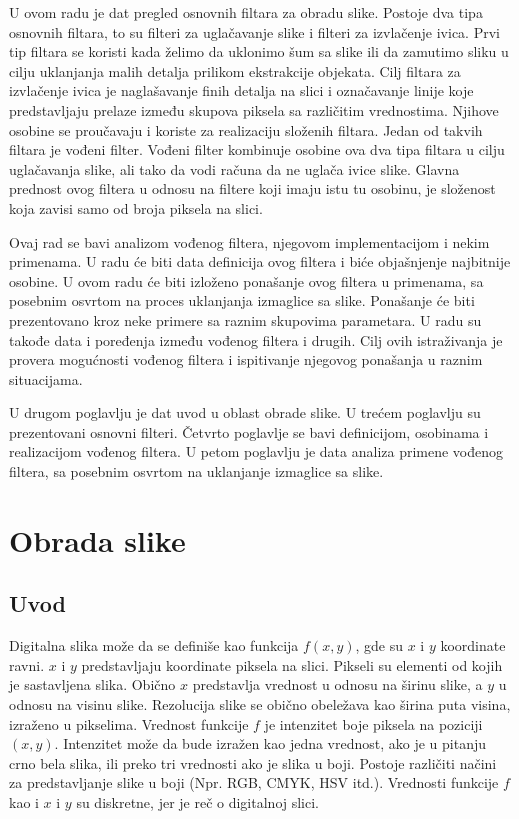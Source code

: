 \documentclass[a4paper,12pt,titlepage]{article}
\begin{document}
U ovom radu je dat pregled osnovnih filtara za obradu slike. Postoje dva tipa osnovnih filtara, to su filteri za uglačavanje slike i filteri za izvlačenje ivica. Prvi tip filtara se koristi kada želimo da uklonimo šum sa slike ili da zamutimo sliku u cilju uklanjanja malih detalja prilikom ekstrakcije objekata. Cilj filtara za izvlačenje ivica je naglašavanje finih detalja na slici i označavanje linije koje predstavljaju prelaze između skupova piksela sa različitim vrednostima. Njihove osobine se proučavaju i koriste za realizaciju složenih filtara. Jedan od takvih filtara je vođeni filter. Vođeni filter kombinuje osobine ova dva tipa filtara u cilju uglačavanja slike, ali tako da vodi računa da ne uglača ivice slike. Glavna prednost ovog filtera u odnosu na filtere koji imaju istu tu osobinu, je složenost koja zavisi samo od broja piksela na slici. 

Ovaj rad se bavi analizom vođenog filtera, njegovom implementacijom i nekim primenama. U radu će biti data definicija ovog filtera i biće objašnjenje najbitnije osobine. U ovom radu će biti izloženo ponašanje ovog filtera u primenama, sa posebnim osvrtom na proces uklanjanja izmaglice sa slike. Ponašanje će biti prezentovano kroz neke primere sa raznim skupovima parametara. U radu su takođe data i poređenja između vođenog filtera i drugih. Cilj ovih istraživanja je provera mogućnosti vođenog filtera i ispitivanje njegovog ponašanja u raznim situacijama. 

U drugom poglavlju je dat uvod u oblast obrade slike. U trećem poglavlju su prezentovani osnovni filteri. Četvrto poglavlje se bavi definicijom, osobinama i realizacijom vođenog filtera. U petom poglavlju je data analiza primene vođenog filtera, sa posebnim osvrtom na uklanjanje izmaglice sa slike.

\section{Obrada slike}%

\subsection{Uvod}%

Digitalna slika može da se definiše kao funkcija $f(x, y)$, gde su $x$ i $y$ koordinate ravni. $x$ i $y$ predstavljaju koordinate piksela na slici. Pikseli su elementi od kojih je sastavljena slika. Obično $x$ predstavlja vrednost u odnosu na širinu slike, a $y$ u odnosu na visinu slike. Rezolucija slike se obično obeležava kao širina puta visina, izraženo u pikselima. Vrednost funkcije $f$ je intenzitet boje piksela na poziciji $(x, y)$. Intenzitet može da bude izražen kao jedna vrednost, ako je u pitanju crno bela slika, ili preko tri vrednosti ako je slika u boji. Postoje različiti načini za predstavljanje slike u boji (Npr. RGB, CMYK, HSV itd.). Vrednosti funkcije $f$ kao i $x$ i $y$ su diskretne, jer je reč o digitalnoj slici. 
 
\end{document}

